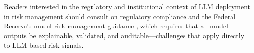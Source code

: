 Readers interested in the regulatory and institutional context of LLM deployment in
risk management should consult  on regulatory compliance and the Federal
Reserve's model risk management guidance \citep{sr117}, which requires
that all model outputs be explainable, validated, and auditable---challenges that apply
directly to LLM-based risk signals.

